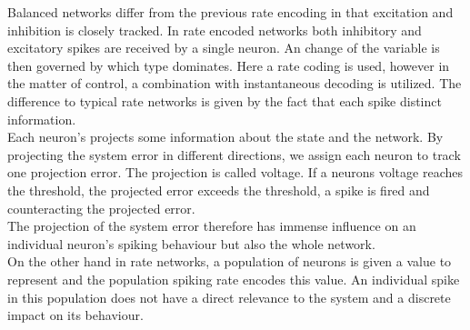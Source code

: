 Balanced networks differ from the previous rate encoding in that excitation and inhibition is closely tracked. In rate encoded networks both inhibitory and excitatory spikes are received by a single neuron. An change of the variable is then governed by which type dominates. Here a rate coding is used, however in the matter of control, a combination with instantaneous decoding is \cite{johnson_minimum-error_2016} utilized. The difference to typical rate networks is given by the fact that each spike distinct information.\\
Each neuron's projects some information about the state and the network. By projecting the system error in different directions, we assign each neuron to track one projection error. The projection is called voltage. If a neurons voltage reaches the threshold, the projected error exceeds the threshold, a spike is fired and counteracting the projected error.\\
The projection of the system error therefore has immense influence on an individual neuron's spiking behaviour but also the whole network.\\
On the other hand in rate networks, a population of neurons is given a value to represent and the population spiking rate encodes this value. An individual spike in this population does not have a direct relevance to the system and a discrete impact on its behaviour.\\




